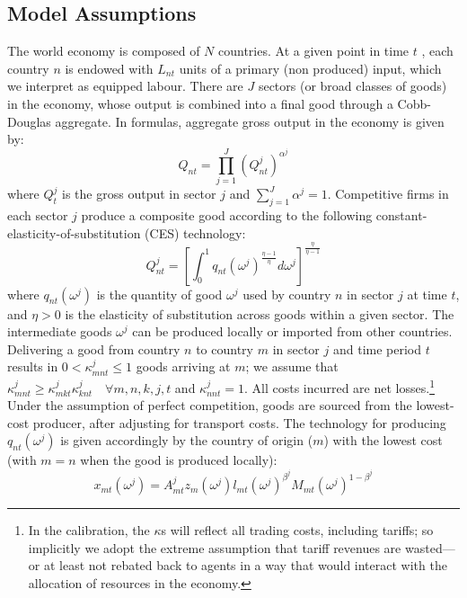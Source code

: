 \documentclass{article}
\begin{document}
\subsection{Model Assumptions}

The world economy is composed of $N$ countries. At a given point in time $t$%
, each country $n$ is endowed with $L_{nt}$ units of a primary (non
produced) input, which we interpret as equipped labour. There are $J$
sectors (or broad classes of goods) in the economy, whose output is combined
into a final good through a Cobb-Douglas aggregate. In formulas, aggregate
gross output in the economy is given by: 
\begin{equation}
Q_{nt}=\prod_{j=1}^{J}\left( Q_{nt}^{j}\right) ^{\alpha ^{j}}
\label{aggregate}
\end{equation}%
where $Q_{t}^{j}$ is the gross output in sector $j$ and $\sum_{j=1}^{J}%
\alpha ^{j}=1$. Competitive firms in each sector $j$ produce a composite
good according to the following constant-elasticity-of-substitution (CES)
technology: 
\begin{equation}
Q_{nt}^{j}=\left[ \int_{0}^{1}q_{nt}(\omega ^{j})^{\frac{\eta -1}{\eta }%
}d\omega ^{j}\right] ^{\frac{\eta }{\eta -1}}  \label{sectoroutput}
\end{equation}%
where $q_{nt}(\omega ^{j})$ is the quantity of good $\omega ^{j}$ used by
country $n$ in sector $j$ at time $t$, and $\eta >0$ is the elasticity of
substitution across goods within a given sector. The intermediate goods $%
\omega ^{j}$ can be produced locally or imported from other countries.
Delivering a good from country $n$ to country $m$ in sector $j$ and time
period $t$ results in $0<\kappa _{mnt}^{j}\leq 1$ goods arriving at $m$; we
assume that $\kappa _{mnt}^{j}\geq \kappa _{mkt}^{j}\kappa _{knt}^{j}\quad
\forall m,n,k,j,t$ and $\kappa _{nnt}^{j}=1$. All costs incurred are net
losses.\footnote{%
In the calibration, the $\kappa $s will reflect all trading costs, including
tariffs; so implicitly we adopt the extreme assumption that tariff revenues
are wasted---or at least not rebated back to agents in a way that would
interact with the allocation of resources in the economy.} Under the
assumption of perfect competition, goods are sourced from the lowest-cost
producer, after adjusting for transport costs. The technology for producing $%
q_{nt}(\omega ^{j})$ is given accordingly by the country of origin ($m$)
with the lowest cost (with $m=n$ when the good is produced locally): 
\begin{equation}
x_{mt}(\omega ^{j})=A_{mt}^{j}z_{m}(\omega ^{j})l_{mt}(\omega ^{j})^{\beta
^{j}}M_{mt}(\omega ^{j})^{1-\beta ^{j}}
\end{equation}%
\end{document}

